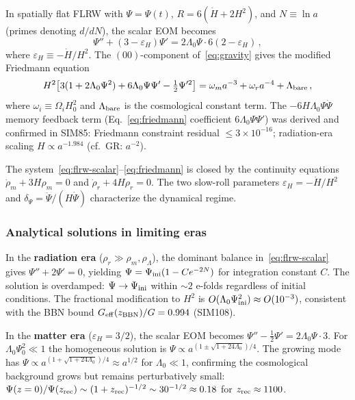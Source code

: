 \documentclass[12pt,a4paper]{article}
\newcommand{\Geff}{G_{\rm eff}}
\newcommand{\Lz}{\Lambda_0}
\begin{document}
In spatially flat FLRW with $\Psi = \Psi(t)$, $R = 6(\dot H + 2H^2)$,
and $N \equiv \ln a$ (primes denoting $d/dN$), the scalar EOM becomes
\begin{equation}
  \Psi'' + (3 - \varepsilon_H)\Psi' = 2\Lz\Psi \cdot 6(2 - \varepsilon_H)\,,
  \label{eq:flrw-scalar}
\end{equation}
where $\varepsilon_H \equiv -\dot H/H^2$. The $(00)$-component of~\eqref{eq:gravity}
gives the modified Friedmann equation
\begin{equation}
  H^2\bigl[3(1 + 2\Lz\Psi^2) + 6\Lz\Psi\Psi' - \tfrac{1}{2}\Psi'^2\bigr]
  = \omega_m a^{-3} + \omega_r a^{-4} + \Lambda_{\rm bare}\,,
  \label{eq:friedmann}
\end{equation}
where $\omega_i \equiv \Omega_i H_0^2$ and $\Lambda_{\rm bare}$ is the
cosmological constant term. The $-6H\Lz\Psi\dot\Psi$ memory feedback term
(Eq.~\ref{eq:friedmann} coefficient $6\Lz\Psi\Psi'$) was derived and confirmed
in SIM85: Friedmann constraint residual $\leq 3\times10^{-16}$; radiation-era
scaling $H \propto a^{-1.984}$ (cf.\ GR: $a^{-2}$).

The system~\eqref{eq:flrw-scalar}--\eqref{eq:friedmann} is closed by the
continuity equations $\dot\rho_m + 3H\rho_m = 0$ and $\dot\rho_r + 4H\rho_r = 0$.
The two slow-roll parameters $\varepsilon_H = -\dot H/H^2$ and
$\delta_\Psi = \ddot\Psi/(H\dot\Psi)$ characterize the dynamical regime.

\subsubsection*{Analytical solutions in limiting eras}

In the \textbf{radiation era} ($\rho_r \gg \rho_m, \rho_\Lambda$), the
dominant balance in~\eqref{eq:flrw-scalar} gives $\Psi'' + 2\Psi' = 0$,
yielding $\Psi = \Psi_{\rm ini}(1 - Ce^{-2N})$ for integration constant $C$.
The solution is overdamped: $\Psi \to \Psi_{\rm ini}$ within $\sim2$ e-folds
regardless of initial conditions. The fractional modification to $H^2$ is
$O(\Lz\Psi_{\rm ini}^2) \approx O(10^{-3})$, consistent with the BBN bound
$\Geff(z_{\rm BBN})/G = 0.994$ (SIM108).

In the \textbf{matter era} ($\varepsilon_H = 3/2$), the scalar EOM becomes
$\Psi'' - \frac{1}{2}\Psi' = 2\Lz\Psi\cdot3$. For $\Lz\Psi_0^2 \ll 1$ the
homogeneous solution is $\Psi \propto a^{(1\pm\sqrt{1+24\Lz})/4}$. The
growing mode has $\Psi \propto a^{(1+\sqrt{1+24\Lz})/4} \approx a^{1/2}$ for
$\Lz \ll 1$, confirming the cosmological background grows but remains
perturbatively small: $\Psi(z=0)/\Psi(z_{\rm rec}) \sim (1+z_{\rm rec})^{-1/2}
\sim 30^{-1/2} \approx 0.18$ for $z_{\rm rec} \approx 1100$.
\end{document}
